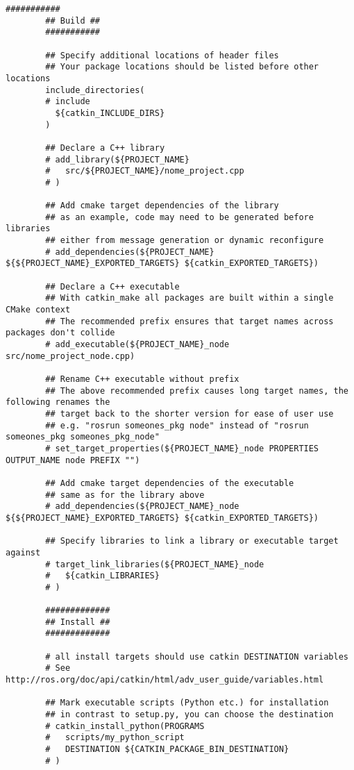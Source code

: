 \documentclass[letterpaper]{article}
\begin{document}
\begin{itemize}
\begin{lstlisting}[style=mystyle, title=src/nome\_project/CMakeLists.txt]
        ###########
        ## Build ##
        ###########
        
        ## Specify additional locations of header files
        ## Your package locations should be listed before other locations
        include_directories(
        # include
          ${catkin_INCLUDE_DIRS}
        )
        
        ## Declare a C++ library
        # add_library(${PROJECT_NAME}
        #   src/${PROJECT_NAME}/nome_project.cpp
        # )
        
        ## Add cmake target dependencies of the library
        ## as an example, code may need to be generated before libraries
        ## either from message generation or dynamic reconfigure
        # add_dependencies(${PROJECT_NAME} ${${PROJECT_NAME}_EXPORTED_TARGETS} ${catkin_EXPORTED_TARGETS})
        
        ## Declare a C++ executable
        ## With catkin_make all packages are built within a single CMake context
        ## The recommended prefix ensures that target names across packages don't collide
        # add_executable(${PROJECT_NAME}_node src/nome_project_node.cpp)
        
        ## Rename C++ executable without prefix
        ## The above recommended prefix causes long target names, the following renames the
        ## target back to the shorter version for ease of user use
        ## e.g. "rosrun someones_pkg node" instead of "rosrun someones_pkg someones_pkg_node"
        # set_target_properties(${PROJECT_NAME}_node PROPERTIES OUTPUT_NAME node PREFIX "")
        
        ## Add cmake target dependencies of the executable
        ## same as for the library above
        # add_dependencies(${PROJECT_NAME}_node ${${PROJECT_NAME}_EXPORTED_TARGETS} ${catkin_EXPORTED_TARGETS})
        
        ## Specify libraries to link a library or executable target against
        # target_link_libraries(${PROJECT_NAME}_node
        #   ${catkin_LIBRARIES}
        # )
        
        #############
        ## Install ##
        #############
        
        # all install targets should use catkin DESTINATION variables
        # See http://ros.org/doc/api/catkin/html/adv_user_guide/variables.html
        
        ## Mark executable scripts (Python etc.) for installation
        ## in contrast to setup.py, you can choose the destination
        # catkin_install_python(PROGRAMS
        #   scripts/my_python_script
        #   DESTINATION ${CATKIN_PACKAGE_BIN_DESTINATION}
        # )
        

\end{lstlisting}
\end{itemize}
\end{document}

